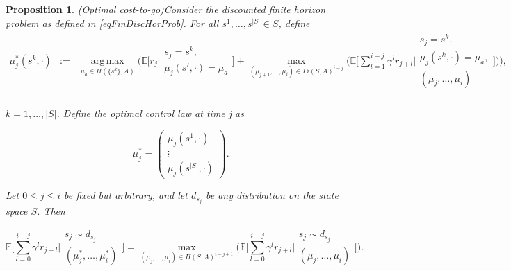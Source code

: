 \documentclass[11pt]{article} %
\newtheorem{prop}{Proposition}
\DeclareMathOperator*{\argmax}{arg\,max}
\begin{document}
\begin{prop}(Optimal cost-to-go)\label{lemBuildingFiniteSolution}
	Consider the discounted finite horizon problem as defined in \ref{eqFinDiscHorProb}. For all $s^1,\dots,s^{|S|} \in S$, define
\begin{equation}
	\begin{array}{clll}
		\mu_j^*(s^k,\cdot)	& := 	& \argmax\limits_{\mu_a \in \Pi(\{s^k\},A)} \Big( \mathbb{E}\Big[r_j \Big| \begin{array}{c}
																							s_j = s^k, \\
																							\mu_j(s',\cdot) = \mu_a
																						\end{array} 
																							\Big] + \max\limits_{(\mu_{j+1},\dots,\mu_i) \in Pi(S,A)^{i-j}}\Big( \mathbb{E} \Big[ \sum\limits_{l=1}^{i-j}\gamma^l r_{j+l} \Big| \begin{array}{c}
															s_j = s^k, \\
															\mu_j(s^k,\cdot) = \mu_a, \\
															(\mu_j,\dots,\mu_i)
														\end{array} \Big] \Big)\Big),\\
	\end{array}
\end{equation}

$k=1,\dots,|S|$. Define the optimal control law at time j as

\begin{equation}
	\mu_j^* = 	\left(\begin{array}{c}
						\mu_j(s^1,\cdot) \\
						\vdots \\
						\mu_j(s^{|S|},\cdot)
				\end{array}\right).
\end{equation}

Let $0\le j \le i$ be fixed but arbitrary, and let $d_{s_j}$ be any distribution on the state space $S$. Then 

\begin{equation}
	\mathbb{E}\Big[ \sum\limits_{l=0}^{i-j} \gamma^l r_{j+l} \Big| 	\begin{array}{c}
														s_j \sim d_{s_j} \\
														(\mu_j^*,\dots,\mu^*_i)
													\end{array} \Big] = \max\limits_{(\mu_j,\dots,\mu_i) \in \Pi(S,A)^{i-j+1}} \Big( \mathbb{E} \Big[ \sum\limits_{l=0}^{i-j} \gamma^l r_{j+l} \Big| 	\begin{array}{c}
													s_j \sim d_{s_j} \\
													(\mu_j,\dots,\mu_i)
												\end{array} \Big] \Big).
\end{equation}


\end{prop}
\end{document}
